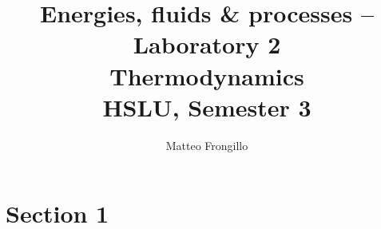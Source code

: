 \documentclass{article}
\title{\textbf{Energies, fluids \& processes -- Laboratory 2 \\ Thermodynamics \\[1ex] HSLU, Semester 3}}
\author{Matteo Frongillo}
\date{}
\begin{document}
\maketitle
\tableofcontents
\pagebreak

\section{Section 1}
\end{document}
